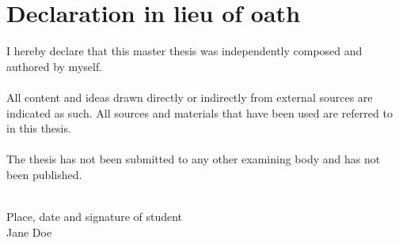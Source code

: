 
\chapter*{Declaration in lieu of oath}

I hereby declare that this master thesis was independently composed and authored by myself. \\ \\


All content and ideas drawn directly or indirectly from external sources are indicated as such. All sources and materials that have been used are referred to in this thesis. \\ \\


The thesis has not been submitted to any other examining body and has not been published.

\vspace{1.5cm}
\\
Place, date and signature of student
\vspace{3cm}
\\
Jane Doe



